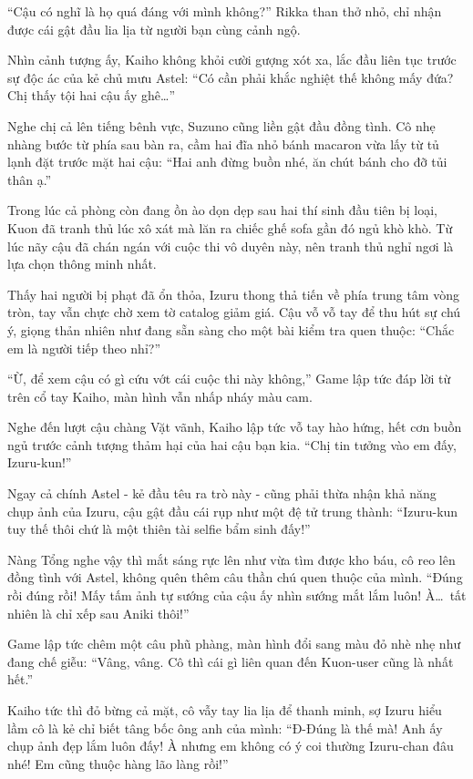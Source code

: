 \documentclass[../main.tex]{subfiles}
\begin{document}

``Cậu có nghĩ là họ quá đáng với mình không?'' Rikka than thở nhỏ, chỉ nhận được cái gật đầu lia lịa từ người bạn cùng cảnh ngộ.

Nhìn cảnh tượng ấy, Kaiho không khỏi cười gượng xót xa, lắc đầu liên tục trước sự độc ác của kẻ chủ mưu Astel: ``Có cần phải khắc nghiệt thế không mấy đứa? Chị thấy tội hai cậu ấy ghê\dots''

Nghe chị cả lên tiếng bênh vực, Suzuno cũng liền gật đầu đồng tình. Cô nhẹ nhàng bước từ phía sau bàn ra, cầm hai đĩa nhỏ bánh macaron vừa lấy từ tủ lạnh đặt trước mặt hai cậu: ``Hai anh đừng buồn nhé, ăn chút bánh cho đỡ tủi thân ạ.''

Trong lúc cả phòng còn đang ồn ào dọn dẹp sau hai thí sinh đầu tiên bị loại, Kuon đã tranh thủ lúc xô xát mà lăn ra chiếc ghế sofa gần đó ngủ khò khò. Từ lúc nãy cậu đã chán ngán với cuộc thi vô duyên này, nên tranh thủ nghỉ ngơi là lựa chọn thông minh nhất.

Thấy hai người bị phạt đã ổn thỏa, Izuru thong thả tiến về phía trung tâm vòng tròn, tay vẫn chực chờ xem tờ catalog giảm giá. Cậu vỗ vỗ tay để thu hút sự chú ý, giọng thản nhiên như đang sẵn sàng cho một bài kiểm tra quen thuộc: ``Chắc em là người tiếp theo nhỉ?''

``Ừ, để xem cậu có gì cứu vớt cái cuộc thi này không,'' Game lập tức đáp lời từ trên cổ tay Kaiho, màn hình vẫn nhấp nháy màu cam.

Nghe đến lượt cậu chàng Vặt vãnh, Kaiho lập tức vỗ tay hào hứng, hết cơn buồn ngủ trước cảnh tượng thảm hại của hai cậu bạn kia. ``Chị tin tưởng vào em đấy, Izuru-kun!''

Ngay cả chính Astel - kẻ đầu têu ra trò này - cũng phải thừa nhận khả năng chụp ảnh của Izuru, cậu gật đầu cái rụp như một đệ tử trung thành: ``Izuru-kun tuy thế thôi chứ là một thiên tài selfie bẩm sinh đấy!''

Nàng Tổng nghe vậy thì mắt sáng rực lên như vừa tìm được kho báu, cô reo lên đồng tình với Astel, không quên thêm câu thần chú quen thuộc của mình. ``Đúng rồi đúng rồi! Mấy tấm ảnh tự sướng của cậu ấy nhìn sướng mắt lắm luôn! À\dots\ tất nhiên là chỉ xếp sau Aniki thôi!''

Game lập tức chêm một câu phũ phàng, màn hình đổi sang màu đỏ nhè nhẹ như đang chế giễu: ``Vâng, vâng. Cô thì cái gì liên quan đến Kuon-user cũng là nhất hết.''

Kaiho tức thì đỏ bừng cả mặt, cô vẫy tay lia lịa để thanh minh, sợ Izuru hiểu lầm cô là kẻ chỉ biết tâng bốc ông anh của mình: ``Đ-Đúng là thế mà! Anh ấy chụp ảnh đẹp lắm luôn đấy! À nhưng em không có ý coi thường Izuru-chan đâu nhé! Em cũng thuộc hàng lão làng rồi!''
\end{document}
